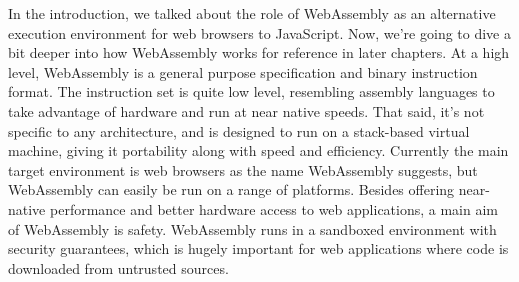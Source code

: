 \documentclass[12pt,a4paper,twoside,openright]{report}
\begin{document}
In the introduction, we talked about the role of WebAssembly as an alternative execution environment for web browsers to JavaScript.
Now, we're going to dive a bit deeper into how WebAssembly works for reference in later chapters.
At a high level, WebAssembly is a general purpose specification and binary instruction format.
The instruction set is quite low level, resembling assembly languages to take advantage of hardware and run at near native speeds.
That said, it's not specific to any architecture, and is designed to run on a stack-based virtual machine, giving it portability along with speed and efficiency.
Currently the main target environment is web browsers as the name WebAssembly suggests, but WebAssembly can easily be run on a range of platforms.
Besides offering near-native performance and better hardware access to web applications, a main aim of WebAssembly is safety.
WebAssembly runs in a sandboxed environment with security guarantees, which is hugely important for web applications where code is downloaded from untrusted sources.
\end{document}
